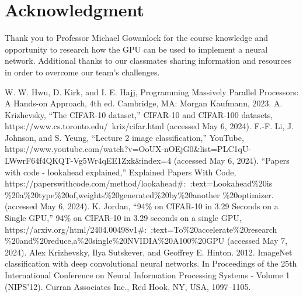 \documentclass[conference]{IEEEtran}
\begin{document}
\section*{Acknowledgment}

Thank you to Professor Michael Gowanlock for the course knowledge and opportunity to research how the GPU can be used to implement a neural network. Additional thanks to our classmates sharing information and resources in order to overcome our team's challenges.

\begin{thebibliography}{00}
 W. W. Hwu, D. Kirk, and I. E. Hajj, Programming Massively Parallel Processors: A Hands-on Approach, 4th ed. Cambridge, MA: Morgan Kaufmann, 2023. 
 A. Krizhevsky, “The CIFAR-10 dataset,” CIFAR-10 and CIFAR-100 datasets, https://www.cs.toronto.edu/~kriz/cifar.html (accessed May 6, 2024). 
 F.-F. Li, J. Johnson, and S. Yeung, “Lecture 2 image classification,” YouTube, https://www.youtube.com/watch?v=OoUX-nOEjG0\&list=PLC1qU-LWwrF64f4QKQT-Vg5Wr4qEE1Zxk\&index=4 (accessed May 6, 2024). 
 “Papers with code - lookahead explained,” Explained Papers With Code, https://paperswithcode.com/method/lookahead\#:~:text=Lookahead\%20is \%20a\%20type\%20of,weights\%20generated\%20by\%20another \%20optimizer. (accessed May 6, 2024). 
K. Jordan, “94\% on CIFAR-10 in 3.29 Seconds on a Single GPU,” 94\% on CIFAR-10 in 3.29 seconds on a single GPU, https://arxiv.org/html/2404.00498v1\#:~:text=To\%20accelerate\%20research \%20and\%20reduce,a\%20single\%20NVIDIA\%20A100\%20GPU (accessed May 7, 2024). 
 Alex Krizhevsky, Ilya Sutskever, and Geoffrey E. Hinton. 2012. ImageNet classification with deep convolutional neural networks. In Proceedings of the 25th International Conference on Neural Information Processing Systems - Volume 1 (NIPS'12). Curran Associates Inc., Red Hook, NY, USA, 1097–1105.

\end{thebibliography}

\appendix
\end{document}
